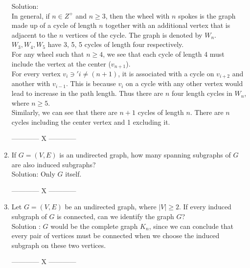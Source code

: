 \documentclass[a4paper]{article}
\begin{document}
\begin{enumerate}
Solution: \\
In general, if $n \in Z^+$ and $n\geq 3$, then the wheel with $n$
spokes is the graph made up of a cycle of length $n$ together
with an additional vertex that is adjacent to the $n$ vertices
of the cycle. The graph is denoted by $W_n$.\\

$W_3, W_4, W_5$ have 3, 5, 5 cycles of length four respectively.\\

For any wheel such that $n \geq 4$, we see that each cycle of length 4 must include the vertex at the center ($v_{n+1}$). \\
For every vertex $v_i \ni ' i \neq (n+1)$, it is associated with a cycle on $v_{i+2}$ and another with $v_{i-1}$. This is because $v_i$ on a cycle with any other vertex would lead to increase in the path length. Thus there are $n$ four length cycles in $W_n$, where $n \geq 5$. \\

Similarly, we can see that there are $n+1$ cycles of length $n$. There are $n$ cycles including the center vertex and 1 excluding it.
\\

\begin{center}
------------ X ------------
\end{center}  

\item If $G = (V, E)$ is an undirected graph, how many spanning
subgraphs of $G$ are also induced subgraphs?\\
Solution: Only $G$ itself. 
\begin{center}
------------ X ------------
\end{center} 

\item Let $G = (V, E)$ be an undirected graph, where $|V| \geq 2$. If
every induced subgraph of $G$ is connected, can we identify the
graph $G$?\\
Solution : $G$ would be the complete graph $K_n$, since we can conclude that every pair of vertices must be connected when we choose the induced subgraph on these two vertices.\\
\begin{center}
------------ X ------------
\end{center} 


\end{enumerate}
\end{document}
